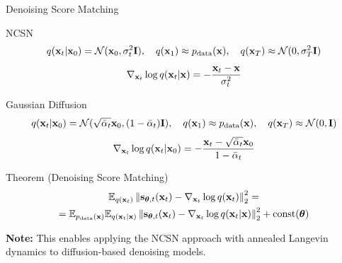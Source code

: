 \documentclass{beamer}
\renewcommand{\eqpause}{}
\begin{document}
\begin{frame}{Denoising Score Matching}
	\begin{block}{NCSN} 
		\vspace{-0.7cm} 
		\[
			q(\mathbf{x}_t | \mathbf{x}_0) = \mathcal{N}(\mathbf{x}_0, \sigma_t^2 \mathbf{I}), \quad q(\mathbf{x}_1) \approx p_{\text{data}}(\mathbf{x}), \quad q(\mathbf{x}_T) \approx \mathcal{N}(0, \sigma_T^2 \mathbf{I})
		\]
		\[
			\nabla_{\mathbf{x}_t} \log q(\mathbf{x}_t | \mathbf{x}) = - \frac{\mathbf{x}_t - \mathbf{x}}{\sigma_t^2}
		\]
		\vspace{-0.6cm} 
	\end{block}
    \eqpause
	\begin{block}{Gaussian Diffusion}
		\vspace{-0.7cm} 
		\[
			q(\mathbf{x}_t | \mathbf{x}_0) = \mathcal{N}(\sqrt{\bar{\alpha}_t} \mathbf{x}_0, (1 - \bar{\alpha}_t) \mathbf{I}), \quad q(\mathbf{x}_1) \approx p_{\text{data}}(\mathbf{x}), \quad q(\mathbf{x}_T) \approx \mathcal{N}(0, \mathbf{I})
		\]
		\[
			\nabla_{\mathbf{x}_t} \log q(\mathbf{x}_t | \mathbf{x}_0) = - \frac{\mathbf{x}_t - \sqrt{\bar{\alpha}_t} \mathbf{x}_0}{1 - \bar{\alpha}_t}
		\]
		\vspace{-0.6cm} 
	\end{block}
    \eqpause
	\begin{block}{Theorem (Denoising Score Matching)}
		\vspace{-0.7cm}
		\begin{multline*}
			\mathbb{E}_{q(\mathbf{x}_t)}\left\| \mathbf{s}_{\boldsymbol{\theta}, t}(\mathbf{x}_t) - \nabla_{\mathbf{x}_t} \log q(\mathbf{x}_t) \right\|_2^2 = \\
			= \mathbb{E}_{p_{\text{data}}(\mathbf{x})} \mathbb{E}_{q(\mathbf{x}_t | \mathbf{x})}\left\| \mathbf{s}_{\boldsymbol{\theta}, t}(\mathbf{x}_t) - \nabla_{\mathbf{x}_t} \log q(\mathbf{x}_t | \mathbf{x}) \right\|_2^2 + \text{const}(\boldsymbol{\theta})
		\end{multline*}
		\vspace{-0.5cm}
	\end{block}
    \eqpause
	\textbf{Note:} This enables applying the NCSN approach with annealed Langevin dynamics to diffusion-based denoising models.
\end{frame}
\end{document}
